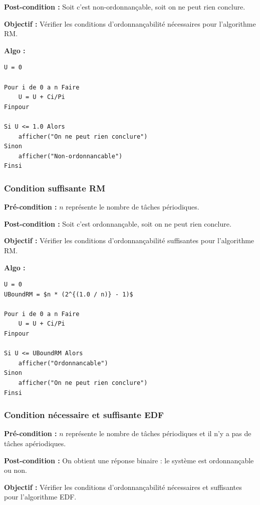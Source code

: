 				\textbf{Post-condition :} Soit c'est non-ordonnançable, soit on ne peut rien conclure.
				
				\textbf{Objectif :} Vérifier les conditions d'ordonnançabilité nécessaires pour l'algorithme RM.
				
				\textbf{Algo :} 
					\begin{lstlisting}
U = 0

Pour i de 0 a n Faire
	U = U + Ci/Pi
Finpour		

Si U <= 1.0 Alors
	afficher("On ne peut rien conclure")
Sinon
	afficher("Non-ordonnancable")
Finsi
					\end{lstlisting}
			
			\subsubsection{Condition suffisante RM}
				\textbf{Pré-condition :} $n$ représente le nombre de tâches périodiques.
				
				\textbf{Post-condition :} Soit c'est ordonnançable, soit on ne peut rien conclure.
				
				\textbf{Objectif :} Vérifier les conditions d'ordonnançabilité suffisantes pour l'algorithme RM.
				
				\textbf{Algo :} 
					\begin{lstlisting}[mathescape]
U = 0
UBoundRM = $n * (2^{(1.0 / n)} - 1)$
					
Pour i de 0 a n Faire
	U = U + Ci/Pi
Finpour

Si U <= UBoundRM Alors
	afficher("Ordonnancable")
Sinon
	afficher("On ne peut rien conclure")
Finsi
					\end{lstlisting}
			
			\subsubsection{Condition nécessaire et suffisante EDF}
				\textbf{Pré-condition :} $n$ représente le nombre de tâches périodiques et il n'y a pas de tâches apériodiques.
				
				\textbf{Post-condition :} On obtient une réponse binaire : le système est ordonnançable ou non.
				
				\textbf{Objectif :} Vérifier les conditions d'ordonnançabilité nécessaires et suffisantes pour l'algorithme EDF.
				
